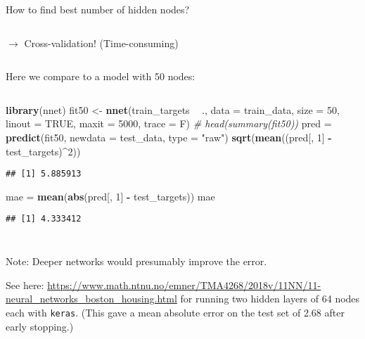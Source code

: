 \documentclass[10pt,ignorenonframetext,]{beamer}
\newenvironment{Shaded}{\begin{snugshade}}{\end{snugshade}}
\newcommand{\CommentTok}[1]{\textcolor[rgb]{0.56,0.35,0.01}{\textit{#1}}}
\newcommand{\DataTypeTok}[1]{\textcolor[rgb]{0.13,0.29,0.53}{#1}}
\newcommand{\DecValTok}[1]{\textcolor[rgb]{0.00,0.00,0.81}{#1}}
\newcommand{\KeywordTok}[1]{\textcolor[rgb]{0.13,0.29,0.53}{\textbf{#1}}}
\newcommand{\NormalTok}[1]{#1}
\newcommand{\OperatorTok}[1]{\textcolor[rgb]{0.81,0.36,0.00}{\textbf{#1}}}
\newcommand{\OtherTok}[1]{\textcolor[rgb]{0.56,0.35,0.01}{#1}}
\newcommand{\StringTok}[1]{\textcolor[rgb]{0.31,0.60,0.02}{#1}}
\begin{document}
\begin{frame}[fragile]

\begin{block}{How to find best number of hidden nodes?}

\(~\)

\(\rightarrow\) Cross-validation! (Time-consuming)

\(~\)

Here we compare to a model with 50 nodes:

\(~\)

\scriptsize

\begin{Shaded}
\begin{Highlighting}[]
\KeywordTok{library}\NormalTok{(nnet)}
\NormalTok{fit50 <-}\StringTok{ }\KeywordTok{nnet}\NormalTok{(train_targets }\OperatorTok{~}\StringTok{ }\NormalTok{., }\DataTypeTok{data =}\NormalTok{ train_data, }\DataTypeTok{size =} \DecValTok{50}\NormalTok{, }\DataTypeTok{linout =} \OtherTok{TRUE}\NormalTok{, }
    \DataTypeTok{maxit =} \DecValTok{5000}\NormalTok{, }\DataTypeTok{trace =}\NormalTok{ F)}
\CommentTok{# head(summary(fit50))}
\NormalTok{pred =}\StringTok{ }\KeywordTok{predict}\NormalTok{(fit50, }\DataTypeTok{newdata =}\NormalTok{ test_data, }\DataTypeTok{type =} \StringTok{"raw"}\NormalTok{)}
\KeywordTok{sqrt}\NormalTok{(}\KeywordTok{mean}\NormalTok{((pred[, }\DecValTok{1}\NormalTok{] }\OperatorTok{-}\StringTok{ }\NormalTok{test_targets)}\OperatorTok{^}\DecValTok{2}\NormalTok{))}
\end{Highlighting}
\end{Shaded}

\begin{verbatim}
## [1] 5.885913
\end{verbatim}

\begin{Shaded}
\begin{Highlighting}[]
\NormalTok{mae =}\StringTok{ }\KeywordTok{mean}\NormalTok{(}\KeywordTok{abs}\NormalTok{(pred[, }\DecValTok{1}\NormalTok{] }\OperatorTok{-}\StringTok{ }\NormalTok{test_targets))}
\NormalTok{mae}
\end{Highlighting}
\end{Shaded}

\begin{verbatim}
## [1] 4.333412
\end{verbatim}

\(~\)

\(~\)

Note: Deeper networks would presumably improve the error.

See here:
\url{https://www.math.ntnu.no/emner/TMA4268/2018v/11NN/11-neural_networks_boston_housing.html}
for running two hidden layers of 64 nodes each with \texttt{keras}.
(This gave a mean absolute error on the test set of 2.68 after early
stopping.)

\end{block}

\end{frame}
\end{document}
